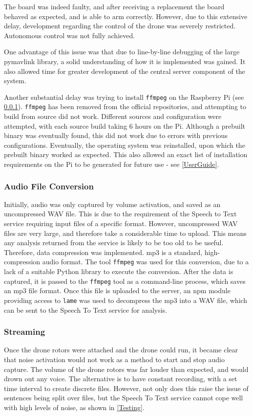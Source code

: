 \documentclass{article}
\begin{document}
The board was indeed faulty, and after receiving a replacement the board behaved as expected, and is able to arm correctly. However, due to this extensive delay, development regarding the control of the drone was severely restricted. Autonomous control was not fully achieved.

One advantage of this issue was that due to line-by-line debugging of the large pymavlink library, a solid understanding of how it is implemented was gained. It also allowed time for greater development of the central server component of the system.

Another substantial delay was trying to install \texttt{ffmpeg} on the Raspberry Pi (see \ref{AudioFile}). \texttt{ffmpeg} has been removed from the official repositories, and attempting to build from source did not work. Different sources and configuration were attempted, with each source build taking 6 hours on the Pi. Although a prebuilt binary was eventually found, this did not work due to errors with previous configurations. Eventually, the operating system was reinstalled, upon which the prebuilt binary worked as expected. This also allowed an exact list of installation requirements on the Pi to be generated for future use - see \ref{UserGuide}. 

\subsubsection{Audio File Conversion}\label{AudioFile}
Initially, audio was only captured by volume activation, and saved as an uncompressed WAV file. This is due to the requirement of the Speech to Text service requiring input files of a specific format. However, uncompressed WAV files are very large, and therefore take a considerable time to upload. This means any analysis returned from the service is likely to be too old to be useful. Therefore, data compression was implemented. mp3 is a standard, high-compression audio format. The tool \texttt{ffmpeg} was used for this conversion, due to a lack of a suitable Python library to execute the conversion. After the data is captured, it is passed to the \texttt{ffmpeg} tool as a command-line process, which saves an mp3 file format. Once this file is uploaded to the server, an npm module\cite{npmlame} providing access to \texttt{lame} was used to decompress the mp3 into a WAV file, which can be sent to the Speech To Text service for analysis. 

\subsubsection{Streaming}\label{Streaming}
Once the drone rotors were attached and the drone could run, it became clear that noise activation would not work as a method to start and stop audio capture. The volume of the drone rotors was far louder than expected, and would drown out any voice. The alternative is to have constant recording, with a set time interval to create discrete files. However, not only does this raise the issue of sentences being split over files, but the Speech To Text service cannot cope well with high levels of noise, as shown in \ref{Testing}. 
\end{document}
